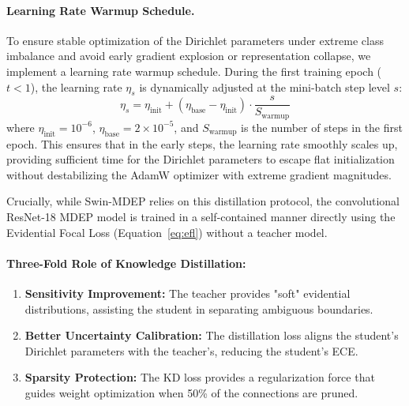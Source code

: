 \documentclass[letterpaper]{article} %
\begin{document}
\paragraph{Learning Rate Warmup Schedule.}
To ensure stable optimization of the Dirichlet parameters under extreme class imbalance and avoid early gradient explosion or representation collapse, we implement a learning rate warmup schedule. During the first training epoch ($t < 1$), the learning rate $\eta_s$ is dynamically adjusted at the mini-batch step level $s$:
\begin{equation}\label{eq:warmup}
    \eta_s = \eta_{\text{init}} + (\eta_{\text{base}} - \eta_{\text{init}}) \cdot \frac{s}{S_{\text{warmup}}}
\end{equation}
where $\eta_{\text{init}} = 10^{-6}$, $\eta_{\text{base}} = 2 \times 10^{-5}$, and $S_{\text{warmup}}$ is the number of steps in the first epoch. This ensures that in the early steps, the learning rate smoothly scales up, providing sufficient time for the Dirichlet parameters to escape flat initialization without destabilizing the AdamW optimizer with extreme gradient magnitudes.

Crucially, while Swin-MDEP relies on this distillation protocol, the convolutional ResNet-18 MDEP model is trained in a self-contained manner directly using the Evidential Focal Loss (Equation~\ref{eq:efl}) without a teacher model.

\paragraph{Three-Fold Role of Knowledge Distillation:}
\begin{enumerate}
    \item \textbf{Sensitivity Improvement:} The teacher provides "soft" evidential distributions, assisting the student in separating ambiguous boundaries.
    \item \textbf{Better Uncertainty Calibration:} The distillation loss aligns the student's Dirichlet parameters with the teacher's, reducing the student's ECE.
    \item \textbf{Sparsity Protection:} The KD loss provides a regularization force that guides weight optimization when 50\% of the connections are pruned.
\end{enumerate}

\end{document}
